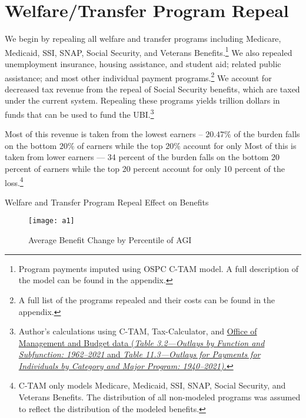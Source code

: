 \documentclass{article}
\begin{document}
\section{Welfare/Transfer Program Repeal}
We begin by repealing all welfare and transfer programs including Medicare, Medicaid, SSI, SNAP, Social Security, and Veterans Benefits.\footnote{Program payments imputed using OSPC C-TAM model. A full description of the model can be found in the appendix.} We also repealed unemployment insurance, housing assistance, and student aid; related public assistance; and most other individual payment programs.\footnote{A full list of the programs repealed and their costs can be found in the appendix.} We account for decreased tax revenue from the repeal of Social Security benefits, which are taxed under the current system. Repealing these programs yields \axag{}trillion dollars in funds that can be used to fund the UBI.\footnote{Author's calculations using C-TAM, Tax-Calculator, and \href{https://obamawhitehouse.archives.gov/omb/budget/Historicals}{Office of Management and Budget data (\textit{Table 3.2—Outlays by Function and Subfunction: 1962–2021} and \textit{Table 11.3—Outlays for Payments for Individuals by Category and Major Program: 1940–2021).}}}

Most of this revenue is taken from the lowest earners -- $20.47\%$ of the burden falls on the bottom $20\%$ of earners while the top $20\%$ account for only 
Most of this is taken from lower earners — 34 percent of the burden falls on the bottom 20 percent of earners while the top 20 percent account for only 10 percent of the loss.\footnote{C-TAM only models Medicare, Medicaid, SSI, SNAP, Social Security, and Veterans Benefits. The distribution of all non-modeled programs was assumed to reflect the distribution of the modeled benefits.}

\begin{table}[H]
\caption{Welfare and Transfer Program Repeal Effect on Benefits}
\begin{center}
\begin{adjustbox}{max width=\textwidth}

\end{adjustbox}
\end{center}
\end{table}

\begin{figure}[H]
\begin{center}
\caption{Average Benefit Change by Percentile of AGI}
\texttt{[image: a1]}
\end{center}
\end{figure}
\end{document}
